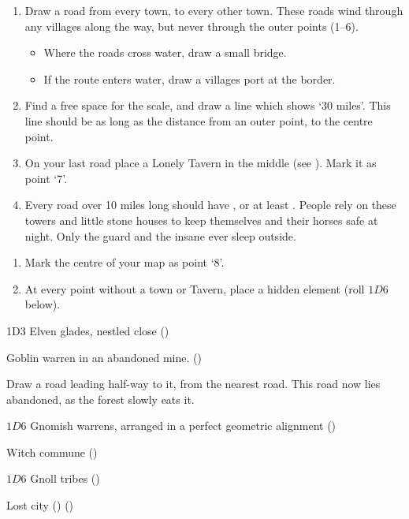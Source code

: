 \begin{multicols}{2}
\begin{dlist}
\end{dlist}


\begin{enumerate}
  \item
  Draw a road from every town, to every other town.
  These roads wind through any \glspl{village} along the way, but never through the outer points (1--6).
  \begin{itemize}
    \item
    Where the roads cross water, draw a small bridge.
    \item
    If the route enters water, draw a \glspl{village} port at the border.
  \end{itemize}
  \item
  Find a free space for the scale, and draw a line which shows `30 miles'.
  This line should be as long as the distance from an outer point, to the centre point.
  \item
  On your last road place a Lonely Tavern in the middle (see ).
  Mark it as point `7'.
  \item
  Every road over 10 miles long should have , or at least .
  People rely on these towers and little stone houses to keep themselves and their horses safe at night.
  Only the \gls{guard} and the insane ever sleep outside.
\end{enumerate}

\label{mapOddities}

\begin{enumerate}
  \item
  Mark the centre of your map as point `8'.
  \item
  At every point without a town or Tavern, place a hidden element (roll $1D6$ below).
\end{enumerate}

\begin{multicols}{2}
\begin{dlist}\raggedright
\item
  1D3 Elven glades, nestled close (\El)
\item
  Goblin warren in an abandoned mine. (\N)

  Draw a road leading half-way to it, from the nearest road.
  This road now lies abandoned, as the forest slowly eats it.
\item
  $1D6$ Gnomish warrens, arranged in a perfect geometric alignment (\Gn)
  \columnbreak
\item
  Witch commune (\Hu)
\item
  $1D6$ Gnoll tribes (\Nl)
\item
  Lost city (\D) ()


\end{dlist}
\end{multicols}
\end{multicols}
